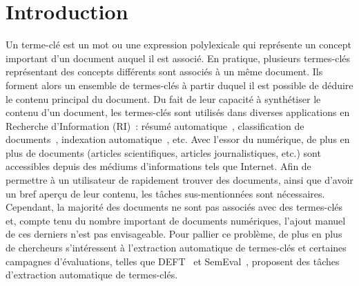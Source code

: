 \section{Introduction}
\label{sec:introduction}
  Un terme-clé est un mot ou une expression polylexicale qui représente un
  concept important d'un document auquel il est associé. En pratique, plusieurs
  termes-clés représentant des concepts différents sont associés à un même
  document. Ils forment alors un ensemble de termes-clés à partir duquel il est
  possible de déduire le contenu principal du document. Du fait de leur capacité
  à synthétiser le contenu d'un document, les termes-clés sont utilisés dans
  diverses applications en Recherche d'Information (RI)~: résumé
  automatique~\cite{avanzo2005keyphrase}, classification de
  documents~\cite{han2007webdocumentclustering}, indexation
  automatique~\cite{medelyan2008smalltrainingset}, etc. Avec l'essor du
  numérique, de plus en plus de documents (articles scientifiques, articles
  journalistiques, etc.) sont accessibles depuis des médiums d'informations tels
  que Internet. Afin de permettre à un utilisateur de rapidement trouver des
  documents, ainsi que d'avoir un bref aperçu de leur contenu, les tâches
  sus-mentionnées sont nécessaires.
  Cependant, la majorité des documents ne sont pas associés avec des termes-clés
  et, compte tenu du nombre important de documents numériques, l'ajout manuel de
  ces derniers n'est pas envisageable. Pour pallier ce problème, de plus en plus
  de chercheurs s'intéressent à l'extraction automatique de termes-clés et
  certaines campagnes d'évaluations, telles que DEFT~\cite{paroubek2012deft} et
  SemEval~\cite{kim2010semeval}, proposent des tâches d'extraction automatique
  de termes-clés.

